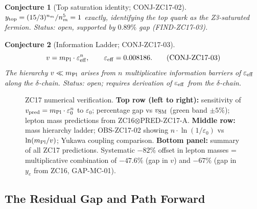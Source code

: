 \documentclass[12pt, a4paper]{article}
\newtheorem{conjecture}{Conjecture}[section]
\begin{document}
\begin{conjecture}[Top saturation identity; CONJ-ZC17-02]
\label{zc17:conj:top-sat}
$y_{\rm top}=(15/3)^{n_m}/n_m^5=1$ exactly, identifying
the top quark as the Z3-saturated fermion.
Status: \emph{open, supported by $0.89\%$ gap (FIND-ZC17-03)}.
\end{conjecture}

\begin{conjecture}[Information Ladder; CONJ-ZC17-03]
\label{zc17:conj:info-ladder}
\begin{equation}
  v = m_{\rm Pl}\cdot\varepsilon_{\rm eff}^n,
  \qquad
  \varepsilon_{\rm eff} = 0.008186.
  \tag{CONJ-ZC17-03}\label{zc17:eq:conj03}
\end{equation}
The hierarchy $v\ll m_{\rm Pl}$ arises from $n$ multiplicative
information barriers of $\varepsilon_{\rm eff}$ along the
$\delta$-chain. Status: \emph{open; requires derivation of
$\varepsilon_{\rm eff}$ from the $\delta$-chain}.
\end{conjecture}

\begin{figure}[h!]
\centering
\caption{ZC17 numerical verification.
\textbf{Top row (left to right):} sensitivity of
$v_{\rm pred}=m_{\rm Pl}\cdot\varepsilon_0^n$ to $\varepsilon_0$;
percentage gap vs $v_{\rm SM}$ (green band $\pm5\%$); lepton
mass predictions from ZC16$\otimes$PRED-ZC17-A.
\textbf{Middle row:} mass hierarchy ladder; OBS-ZC17-02 showing
$n\cdot\ln(1/\varepsilon_0)$ vs $\ln(m_{\rm Pl}/v)$; Yukawa
coupling comparison.
\textbf{Bottom panel:} summary of all ZC17 predictions.
Systematic $-82\%$ offset in lepton masses = multiplicative
combination of $-47.6\%$ (gap in $v$) and $-67\%$ (gap in
$y_e$ from ZC16, GAP-MC-01).}
\label{zc17:fig:verify}
\end{figure}

\subsection{The Residual Gap and Path Forward}
\label{zc17:sec:gap-zc17}
\end{document}
